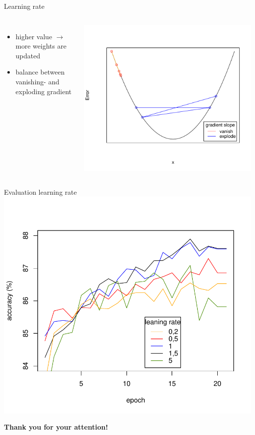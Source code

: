 \documentclass[aspectratio=1610, 12pt]{beamer}
\begin{document}
\begin{frame}{Learning rate}
	\begin{columns}
		\begin{itemize}
			\item higher value $\rightarrow$ more weights are updated
			\item balance between vanishing- and exploding gradient
		\end{itemize}
		\centering
		\vspace*{-1cm}\includegraphics[scale=0.5]{images/gradient_graph.pdf}



	\end{columns}

\end{frame}
\begin{frame}{Evaluation learning rate}
	\centering
	\vspace*{-1cm}\includegraphics[scale=0.6]{images/learningrate_measurement.pdf}
\end{frame}

\begin{frame}
\centering

\vfill
\textbf{\Large Thank you for your attention!}
\vfill
\end{frame}
\end{document}
